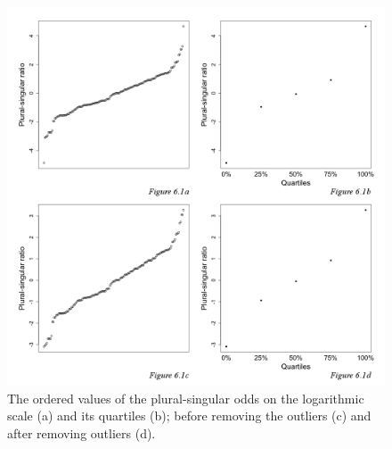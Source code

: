 \begin{figure}
\includegraphics[width=\textwidth]{figures/6-Figure_1.png}
\caption{The ordered values of the plural-singular odds on the logarithmic scale (a) and its quartiles (b); before removing the outliers (c) and after removing outliers (d).\label{fig:6:1}}
\end{figure}


